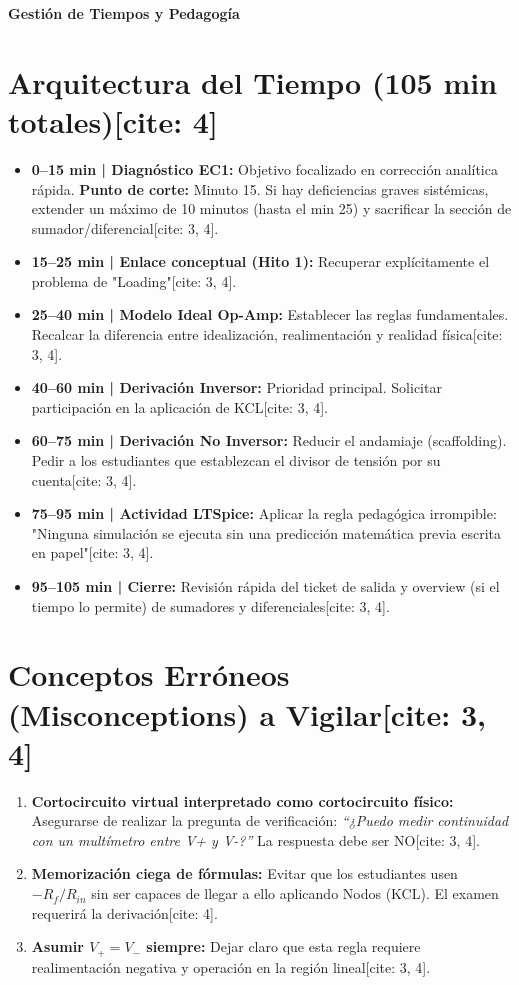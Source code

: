 \documentclass[11pt, a4paper]{article}
\begin{document}
\begin{tcolorbox}[colback=ucbblue!5!white, colframe=ucbblue, title=\textbf{Notas del Instructor - Sesión 2 (Semana 5)}]
    \centering \large \textbf{Gestión de Tiempos y Pedagogía}
\end{tcolorbox}

\section*{Arquitectura del Tiempo (105 min totales)[cite: 4]}
\begin{itemize}
    \item \textbf{0–15 min | Diagnóstico EC1:} Objetivo focalizado en corrección analítica rápida. \textbf{Punto de corte:} Minuto 15. Si hay deficiencias graves sistémicas, extender un máximo de 10 minutos (hasta el min 25) y sacrificar la sección de sumador/diferencial[cite: 3, 4].
    \item \textbf{15–25 min | Enlace conceptual (Hito 1):} Recuperar explícitamente el problema de "Loading"[cite: 3, 4].
    \item \textbf{25–40 min | Modelo Ideal Op-Amp:} Establecer las reglas fundamentales. Recalcar la diferencia entre idealización, realimentación y realidad física[cite: 3, 4].
    \item \textbf{40–60 min | Derivación Inversor:} Prioridad principal. Solicitar participación en la aplicación de KCL[cite: 3, 4].
    \item \textbf{60–75 min | Derivación No Inversor:} Reducir el andamiaje (scaffolding). Pedir a los estudiantes que establezcan el divisor de tensión por su cuenta[cite: 3, 4].
    \item \textbf{75–95 min | Actividad LTSpice:} Aplicar la regla pedagógica irrompible: "Ninguna simulación se ejecuta sin una predicción matemática previa escrita en papel"[cite: 3, 4].
    \item \textbf{95–105 min | Cierre:} Revisión rápida del ticket de salida y overview (si el tiempo lo permite) de sumadores y diferenciales[cite: 3, 4].
\end{itemize}

\section*{Conceptos Erróneos (Misconceptions) a Vigilar[cite: 3, 4]}
\begin{enumerate}
    \item \textbf{Cortocircuito virtual interpretado como cortocircuito físico:} Asegurarse de realizar la pregunta de verificación: \textit{“¿Puedo medir continuidad con un multímetro entre V+ y V-?”} La respuesta debe ser NO[cite: 3, 4].
    \item \textbf{Memorización ciega de fórmulas:} Evitar que los estudiantes usen $-R_f/R_{in}$ sin ser capaces de llegar a ello aplicando Nodos (KCL). El examen requerirá la derivación[cite: 4].
    \item \textbf{Asumir $V_+ = V_-$ siempre:} Dejar claro que esta regla requiere realimentación negativa y operación en la región lineal[cite: 3, 4].
\end{enumerate}
\end{document}
